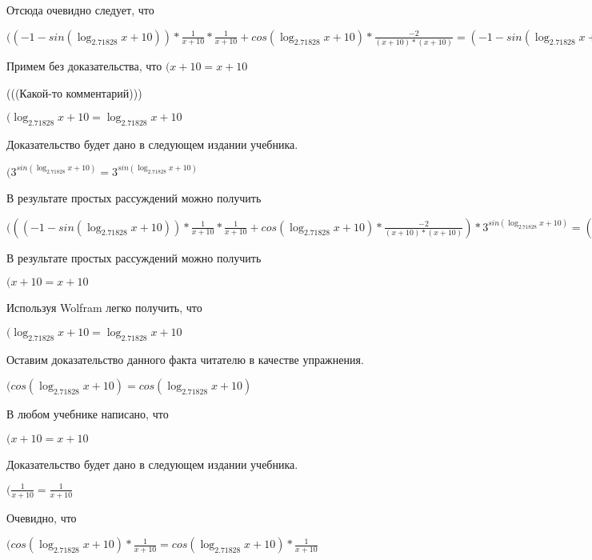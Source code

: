 \documentclass[12pt,a4paper,fleqn]{article}
\theoremstyle{definition}
\begin{document}
Отсюда очевидно следует, что

$(( -1  - sin(\log_{ 2.71828 }{ x  +  10 })) * \frac{ 1 }{ x  +  10 }
 * \frac{ 1 }{ x  +  10 }
 + cos(\log_{ 2.71828 }{ x  +  10 }) * \frac{ -2 }{( x  +  10 ) * ( x  +  10 )}
 = ( -1  - sin(\log_{ 2.71828 }{ x  +  10 })) * \frac{ 1 }{ x  +  10 }
 * \frac{ 1 }{ x  +  10 }
 + cos(\log_{ 2.71828 }{ x  +  10 }) * \frac{ -2 }{( x  +  10 ) * ( x  +  10 )}
$

Примем без доказательства, что
$( x  +  10  =  x  +  10 $

(((Какой-то комментарий)))

$(\log_{ 2.71828 }{ x  +  10 } = \log_{ 2.71828 }{ x  +  10 }$

Доказательство будет дано в следующем издании учебника.

$({ 3 }^{sin(\log_{ 2.71828 }{ x  +  10 })} = { 3 }^{sin(\log_{ 2.71828 }{ x  +  10 })}$

В результате простых рассуждений можно получить

$((( -1  - sin(\log_{ 2.71828 }{ x  +  10 })) * \frac{ 1 }{ x  +  10 }
 * \frac{ 1 }{ x  +  10 }
 + cos(\log_{ 2.71828 }{ x  +  10 }) * \frac{ -2 }{( x  +  10 ) * ( x  +  10 )}
) * { 3 }^{sin(\log_{ 2.71828 }{ x  +  10 })} = (( -1  - sin(\log_{ 2.71828 }{ x  +  10 })) * \frac{ 1 }{ x  +  10 }
 * \frac{ 1 }{ x  +  10 }
 + cos(\log_{ 2.71828 }{ x  +  10 }) * \frac{ -2 }{( x  +  10 ) * ( x  +  10 )}
) * { 3 }^{sin(\log_{ 2.71828 }{ x  +  10 })}$

В результате простых рассуждений можно получить

$( x  +  10  =  x  +  10 $

Используя Wolfram легко получить, что

$(\log_{ 2.71828 }{ x  +  10 } = \log_{ 2.71828 }{ x  +  10 }$

Оставим доказательство данного факта читателю в качестве упражнения.

$(cos(\log_{ 2.71828 }{ x  +  10 }) = cos(\log_{ 2.71828 }{ x  +  10 })$

В любом учебнике написано, что

$( x  +  10  =  x  +  10 $

Доказательство будет дано в следующем издании учебника.

$(\frac{ 1 }{ x  +  10 }
 = \frac{ 1 }{ x  +  10 }
$

Очевидно, что

$(cos(\log_{ 2.71828 }{ x  +  10 }) * \frac{ 1 }{ x  +  10 }
 = cos(\log_{ 2.71828 }{ x  +  10 }) * \frac{ 1 }{ x  +  10 }
$
\end{document}
